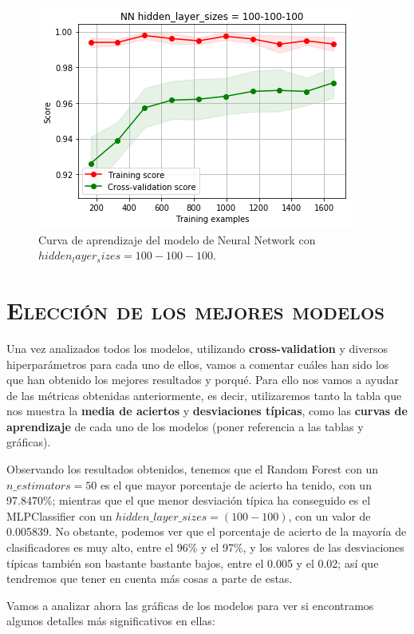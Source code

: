 \documentclass[11pt,a4paper]{article}
\begin{document}
\begin{figure}[H]
    \centering
    \includegraphics[scale=0.7]{img/lc-nn-100-100-100.png}
    \caption{Curva de aprendizaje del modelo de Neural Network con $hidden_layer_sizes=100-100-100$.}
    \label{fig:lc-nn-100-100-100}
\end{figure}

\newpage

\section{\textsc{Elección de los mejores modelos}}

Una vez analizados todos los modelos, utilizando \textbf{cross-validation} y diversos hiperparámetros para cada uno de ellos, vamos a
comentar cuáles han sido los que han obtenido los mejores resultados y porqué. Para ello nos vamos a ayudar de las métricas obtenidas
anteriormente, es decir, utilizaremos tanto la tabla que nos muestra la \textbf{media de aciertos} y \textbf{desviaciones típicas}, como
las \textbf{curvas de aprendizaje} de cada uno de los modelos (poner referencia a las tablas y gráficas).

Observando los resultados obtenidos, tenemos que el Random Forest con un $n\_estimators = 50$ es el que mayor porcentaje de acierto ha
tenido, con un 97.8470\%; mientras que el que menor desviación típica ha conseguido es el MLPClassifier con un $hidden\_layer\_sizes =
(100-100)$, con un valor de 0.005839. No obstante, podemos ver que el porcentaje de acierto de la mayoría de clasificadores es muy alto,
entre el 96\% y el 97\%, y los valores de las desviaciones típicas también son bastante bastante bajos, entre el 0.005 y el 0.02; así que
tendremos que tener en cuenta más cosas a parte de estas.

Vamos a analizar ahora las gráficas de los modelos para ver si encontramos algunos detalles más significativos en ellas:
\end{document}
